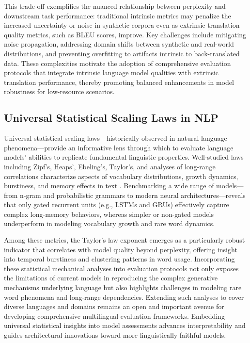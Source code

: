 \documentclass[11pt]{article}
\begin{document}
This trade-off exemplifies the nuanced relationship between perplexity and downstream task performance: traditional intrinsic metrics may penalize the increased uncertainty or noise in synthetic corpora even as extrinsic translation quality metrics, such as BLEU scores, improve. Key challenges include mitigating noise propagation, addressing domain shifts between synthetic and real-world distributions, and preventing overfitting to artifacts intrinsic to back-translated data. These complexities motivate the adoption of comprehensive evaluation protocols that integrate intrinsic language model qualities with extrinsic translation performance, thereby promoting balanced enhancements in model robustness for low-resource scenarios.

\subsection{Universal Statistical Scaling Laws in NLP}

Universal statistical scaling laws—historically observed in natural language phenomena—provide an informative lens through which to evaluate language models' abilities to replicate fundamental linguistic properties. Well-studied laws including Zipf’s, Heaps’, Ebeling’s, Taylor’s, and analyses of long-range correlations characterize aspects of vocabulary distributions, growth dynamics, burstiness, and memory effects in text \cite{ref51}. Benchmarking a wide range of models—from n-gram and probabilistic grammars to modern neural architectures—reveals that only gated recurrent units (e.g., LSTMs and GRUs) effectively capture complex long-memory behaviors, whereas simpler or non-gated models underperform in modeling vocabulary growth and rare word dynamics.

Among these metrics, the Taylor’s law exponent emerges as a particularly robust indicator that correlates with model quality beyond perplexity, offering insight into temporal burstiness and clustering patterns in word usage. Incorporating these statistical mechanical analyses into evaluation protocols not only exposes the limitations of current models in reproducing the complex generative mechanisms underlying language but also highlights challenges in modeling rare word phenomena and long-range dependencies. Extending such analyses to cover diverse languages and domains remains an open and important avenue for developing comprehensive multilingual evaluation frameworks. Embedding universal statistical insights into model assessments advances interpretability and guides architectural innovations toward more linguistically faithful models.
\end{document}
